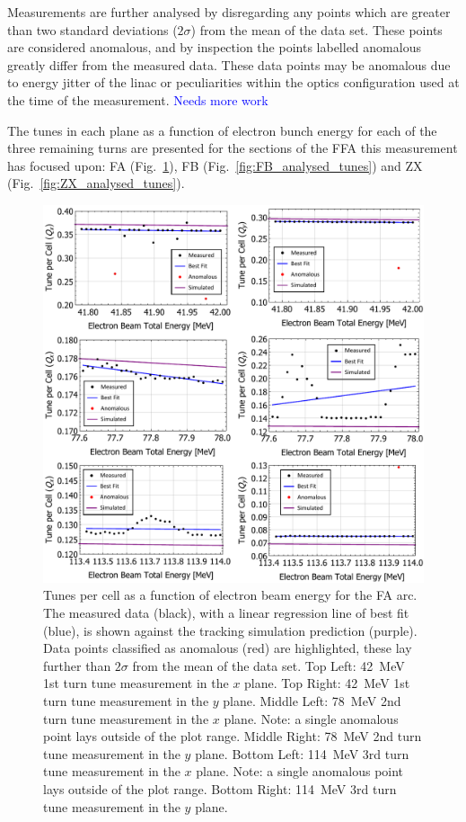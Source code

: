 \documentclass[../main.tex]{subfiles}
\begin{document}
Measurements are further analysed by disregarding any points which are greater than two standard deviations ($2\sigma$) from the mean of the data set. These points are considered anomalous, and by inspection the points labelled anomalous greatly differ from the measured data. These data points may be anomalous due to energy jitter of the linac or peculiarities within the optics configuration used at the time of the measurement. \textcolor{blue}{Needs more work}

The tunes in each plane as a function of electron bunch energy for each of the three remaining turns are presented for the sections of the FFA this measurement has focused upon: FA (Fig.~\ref{fig:FA_analysed_tunes}), FB (Fig.~\ref{fig:FB_analysed_tunes}) and ZX (Fig.~\ref{fig:ZX_analysed_tunes}).

\begin{figure}[!h]
\centering
\includegraphics[width=\textwidth]{Figures/CBETA_Multi-Pass_Commissioning/chromaticity/FA_analysed_3turn_tunes.pdf}
\caption{Tunes per cell as a function of electron beam energy for the FA arc. The measured data (black), with a linear regression line of best fit (blue), is shown against the tracking simulation prediction (purple). Data points classified as anomalous (red) are highlighted, these lay further than $2\sigma$ from the mean of the data set. Top Left: 42~\si{\mega\electronvolt} 1st turn tune measurement in the $x$ plane. Top Right: 42~\si{\mega\electronvolt} 1st turn tune measurement in the $y$ plane. Middle Left: 78~\si{\mega\electronvolt} 2nd turn tune measurement in the $x$ plane. Note: a single anomalous point lays outside of the plot range. Middle Right: 78~\si{\mega\electronvolt} 2nd turn tune measurement in the $y$ plane. Bottom Left:  114~\si{\mega\electronvolt} 3rd turn tune measurement in the $x$ plane. Note: a single anomalous point lays outside of the plot range. Bottom Right: 114~\si{\mega\electronvolt} 3rd turn tune measurement in the $y$ plane.}
\label{fig:FA_analysed_tunes}
\end{figure}
\end{document}
